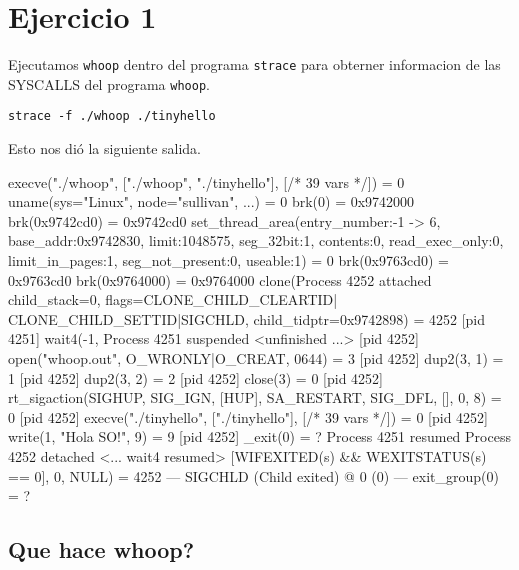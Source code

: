 
\section{Ejercicio 1}

Ejecutamos \verb|whoop| dentro del programa \verb|strace| para obterner informacion de las SYSCALLS del programa \verb|whoop|.

\begin{framed}
\begin{verbatim}
strace -f ./whoop ./tinyhello
\end{verbatim}
\end{framed}

Esto nos di\'o la siguiente salida.

\begin{framed}
\begin{verbatimtab}
execve("./whoop", ["./whoop", "./tinyhello"], [/* 39 vars */]) = 0
uname({sys="Linux", node="sullivan", ...}) = 0
brk(0)                                  = 0x9742000
brk(0x9742cd0)                          = 0x9742cd0
set_thread_area({entry_number:-1 -> 6, base_addr:0x9742830, limit:1048575, 
  seg_32bit:1, contents:0, read_exec_only:0, limit_in_pages:1, 
  seg_not_present:0, useable:1}) = 0
brk(0x9763cd0)                          = 0x9763cd0
brk(0x9764000)                          = 0x9764000
clone(Process 4252 attached child_stack=0, flags=CLONE_CHILD_CLEARTID|
  CLONE_CHILD_SETTID|SIGCHLD, child_tidptr=0x9742898) = 4252
[pid  4251] wait4(-1, Process 4251 suspended
 <unfinished ...>
[pid  4252] open("whoop.out", O_WRONLY|O_CREAT, 0644) = 3
[pid  4252] dup2(3, 1)                  = 1
[pid  4252] dup2(3, 2)                  = 2
[pid  4252] close(3)                    = 0
[pid  4252] rt_sigaction(SIGHUP, {SIG_IGN, [HUP], SA_RESTART}, 
  {SIG_DFL, [], 0}, 8) = 0
[pid  4252] execve("./tinyhello", ["./tinyhello"], [/* 39 vars */]) = 0
[pid  4252] write(1, "Hola SO!\n", 9)   = 9
[pid  4252] _exit(0)                    = ?
Process 4251 resumed
Process 4252 detached
<... wait4 resumed> [{WIFEXITED(s) && WEXITSTATUS(s) == 0}], 0, NULL) = 4252
--- SIGCHLD (Child exited) @ 0 (0) ---
exit_group(0)                           = ?
\end{verbatimtab}
\end{framed}

\subsection{Que hace whoop?}

